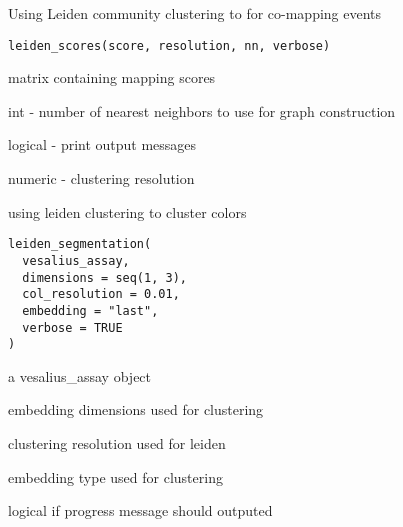 \documentclass[a4paper]{book}
\begin{document}
%
\begin{Description}
Using Leiden community clustering to for co-mapping events
\end{Description}
%
\begin{Usage}
\begin{verbatim}
leiden_scores(score, resolution, nn, verbose)
\end{verbatim}
\end{Usage}
%
\begin{Arguments}
\begin{ldescription}
\item[\code{score}] matrix containing mapping scores

\item[\code{nn}] int - number of nearest neighbors to use for graph construction

\item[\code{verbose}] logical - print output messages

\item[\code{resoltuion}] numeric - clustering resolution
\end{ldescription}
\end{Arguments}
%
\begin{Description}
using leiden clustering to cluster colors
\end{Description}
%
\begin{Usage}
\begin{verbatim}
leiden_segmentation(
  vesalius_assay,
  dimensions = seq(1, 3),
  col_resolution = 0.01,
  embedding = "last",
  verbose = TRUE
)
\end{verbatim}
\end{Usage}
%
\begin{Arguments}
\begin{ldescription}
\item[\code{vesalius\_assay}] a vesalius\_assay object

\item[\code{dimensions}] embedding dimensions used for clustering

\item[\code{col\_resolution}] clustering resolution used for leiden

\item[\code{embedding}] embedding type used for clustering

\item[\code{verbose}] logical if progress message should outputed
\end{ldescription}
\end{Arguments}
\end{document}
